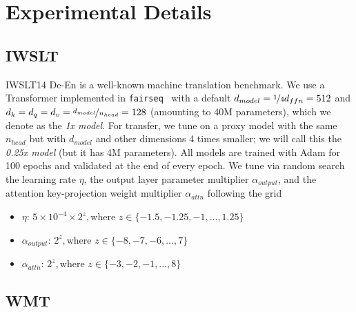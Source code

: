 \documentclass{article}
\theoremstyle{definition}
\begin{document}
\section{Experimental Details}
\label{sec:experimentaldetails}

\subsection{IWSLT}
\label{sec:IWSLTdetails}
IWSLT14 De-En is a well-known machine translation benchmark.
We use a Transformer implemented in \texttt{fairseq}~\citep{ott2019fairseq} with a default $d_{model} = \nicefrac{1}{4} d_{ffn} = 512$ and $d_{k}=d_{q}=d_{v}=\nicefrac{d_{model}}{n_{head}}=128$ (amounting to 40M parameters), which we denote as the \emph{1x model}.
For transfer, we tune on a proxy model with the same $n_{head}$ 
but with $d_{model}$ and other dimensions 4 times smaller; we will call this the \emph{0.25x model} (but it has 4M parameters).
All models are trained with Adam for 100 epochs and validated at the end of every epoch.
We tune via random search the learning rate $\eta$, the output layer parameter multiplier $\alpha_{output}$, and the attention key-projection weight multiplier $\alpha_{attn}$ following the grid
\begin{itemize}
    \item $\eta$: $5 \times 10^{-4} \times 2^z, \text{where } z\in \{-1.5, -1.25, -1, ..., 1.25\}$ 
    \item $\alpha_{output}$: $2^z, \text{where } z\in \{-8, -7, -6, ..., 7\}$ 
    \item $\alpha_{attn}$: $2^z, \text{where } z\in\{-3, -2, -1, ..., 8\}$ 
\end{itemize}

\subsection{WMT}
\label{sec:WMTdetails}
\end{document}

